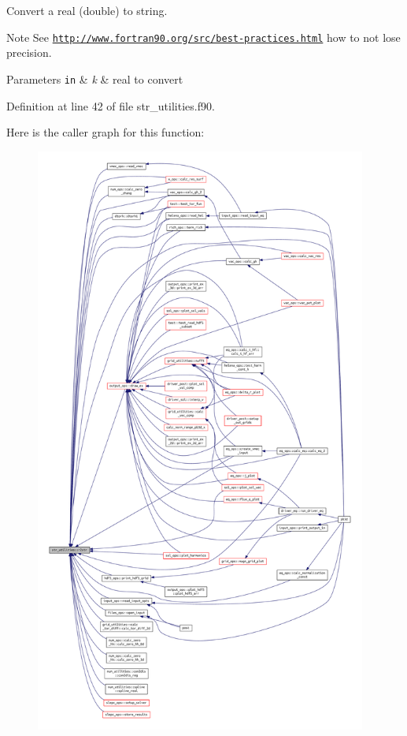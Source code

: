 Convert a real (double) to string. 

\begin{DoxyNote}{Note}
See \href{http://www.fortran90.org/src/best-practices.html}{\tt http\+://www.\+fortran90.\+org/src/best-\/practices.\+html} how to not lose precision.
\end{DoxyNote}

\begin{DoxyParams}[1]{Parameters}
\mbox{\tt in}  & {\em k} & real to convert \\
\hline
\end{DoxyParams}


Definition at line 42 of file str\+\_\+utilities.\+f90.

Here is the caller graph for this function\+:
\nopagebreak
\begin{figure}[H]
\begin{center}
\leavevmode
\includegraphics[height=550pt]{namespacestr__utilities_a92ac6c0af1979df094de1caddd28ade0_icgraph}
\end{center}
\end{figure}
\mbox{\label{namespacestr__utilities_ac778d706b2e021672618939ab58fdd32}} 

